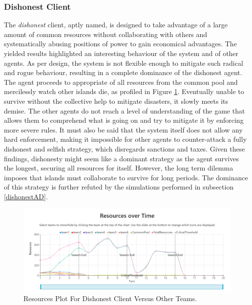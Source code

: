 \subsubsection{Dishonest Client}
The \emph{dishonest} client, aptly named, is designed to take advantage of a large amount of common resources without collaborating with others and systematically abusing positions of power to gain economical advantages. The yielded results highlighted an interesting behaviour of the system and of other agents. As per design, the system is not flexible enough to mitigate such radical and rogue behaviour, resulting in a complete dominance of the dishonest agent. The agent proceeds to appropriate of all resources from the common pool and mercilessly watch other islands die, as profiled in Figure \ref{fig:ResourcesDO}. Eventually unable to survive without the collective help to mitigate disasters, it slowly meets its demise. The other agents do not reach a level of understanding of the game that allows them to comprehend what is going on and try to mitigate it by enforcing more severe rules. It must also be said that the system itself does not allow any hard enforcement, making it impossible for other agents to counter-attack a fully dishonest and selfish strategy, which disregards sanctions and taxes. Given these findings, dishonesty might seem like a dominant strategy as the agent survives the longest, securing all resources for itself. However, the long term dilemma imposes that islands must collaborate to survive for long periods. The dominance of this strategy is further refuted by the simulations performed in subsection \ref{dishonestAD}.

\begin{figure}[H]
\centering
\includegraphics[scale=0.4]{12_team4_agentdesign/images/ResourcesDO.png}
\caption{Resources Plot For Dishonest Client Versus Other Teams.}
\label{fig:ResourcesDO}
\end{figure}

